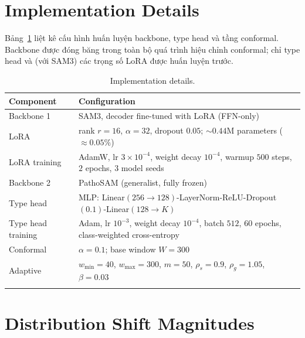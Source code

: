 \documentclass[pdflatex,sn-mathphys-num]{sn-jnl}
\begin{document}
\begin{appendices}

\section{Implementation Details}\label{secA:impl}

Bảng~\ref{tab:impl} liệt kê cấu hình huấn luyện backbone, type head và tầng conformal.
Backbone được đóng băng trong toàn bộ quá trình hiệu chỉnh conformal; chỉ type head
và (với SAM3) các trọng số LoRA được huấn luyện trước.
\begin{table}[htbp]
\caption{Implementation details.}
\label{tab:impl}
\centering
\small
\begin{tabular}{@{}ll@{}}
\toprule
Component & Configuration \\
\midrule
Backbone 1 & SAM3, decoder fine-tuned with LoRA (FFN-only) \\
\quad LoRA & rank $r=16$, $\alpha=32$, dropout $0.05$; $\sim\!0.44$M parameters ($\approx 0.05\%$) \\
\quad LoRA training & AdamW, lr $3\times10^{-4}$, weight decay $10^{-4}$, warmup $500$ steps, $2$ epochs, $3$ model seeds \\
Backbone 2 & PathoSAM (generalist, fully frozen) \\
Type head & MLP: Linear$(256\!\to\!128)$-LayerNorm-ReLU-Dropout$(0.1)$-Linear$(128\!\to\!K)$ \\
\quad Type head training & Adam, lr $10^{-3}$, weight decay $10^{-4}$, batch $512$, $60$ epochs, class-weighted cross-entropy \\
Conformal & $\alpha=0.1$; base window $W=300$ \\
\quad Adaptive & $w_{\min}=40$, $w_{\max}=300$, $m=50$, $\rho_s=0.9$, $\rho_g=1.05$, $\beta=0.03$ \\
\botrule
\end{tabular}
\end{table}

\section{Distribution Shift Magnitudes}\label{secA:shift}


\end{appendices}
\end{document}
